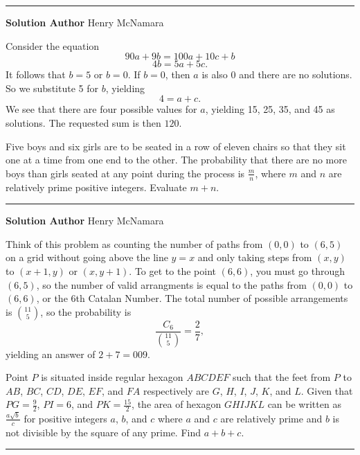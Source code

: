 \documentclass[11pt]{scrartcl}
\newcommand*{\problemfont}{\sffamily\bfseries}
\begin{document}
\vspace{-\baselineskip}\rule{\textwidth}{0.4pt}

{\problemfont Solution Author} Henry McNamara

Consider the equation
\[90a + 9b = 100a + 10c + b\]
\[4b = 5a + 5c.\]
It follows that $b = 5$ or $b = 0$. If $b = 0$, then $a$ is also 0 and there are no solutions. So we substitute 5 for $b$, yielding
\[4 = a + c.\]
We see that there are four possible values for $a$, yielding 15, 25, 35, and 45 as solutions. The requested sum is then $\boxed{120}$.

\pagebreak

\begin{problem}
    Five boys and six girls are to be seated in a row of eleven chairs so that they sit one at a time from one end to the other. The probability that there are no more boys than girls seated at any point during the process is $\frac{m}{n}$, where $m$ and $n$ are relatively prime positive integers. Evaluate $m + n$.
\end{problem}

\vspace{-\baselineskip}\rule{\textwidth}{0.4pt}

{\problemfont Solution Author} Henry McNamara

Think of this problem as counting the number of paths from $(0,0)$ to $(6,5)$ on a grid without going above the line $y = x$ and only taking steps from $(x,y)$ to $(x + 1,y)$ or $(x, y + 1)$. To get to the point $(6, 6)$, you must go through $(6, 5)$, so the number of valid arrangments is equal to the paths from $(0,0)$ to $(6,6)$, or the 6th Catalan Number. The total number of possible arrangements is ${11 \choose 5}$, so the probability is
\[\frac{C_{6}}{{11 \choose 5}} = \frac{2}{7},\]
yielding an answer of $2 + 7 = \boxed{009}$.

\pagebreak

\begin{problem}
    Point $P$ is situated inside regular hexagon $ABCDEF$ such that the feet from $P$ to $AB$, $BC$, $CD$, $DE$, $EF$, and $FA$ respectively are $G$, $H$, $I$, $J$, $K$, and $L$. Given that $PG = \frac{9}{2}$, $PI = 6$, and $PK = \frac{15}{2}$, the area of hexagon $GHIJKL$ can be written as $\frac{a\sqrt{b}}{c}$ for positive integers $a$, $b$, and $c$ where $a$ and $c$ are relatively prime and $b$ is not divisible by the square of any prime. Find $a + b + c$.
\end{problem}

\vspace{-\baselineskip}\rule{\textwidth}{0.4pt}
\end{document}
